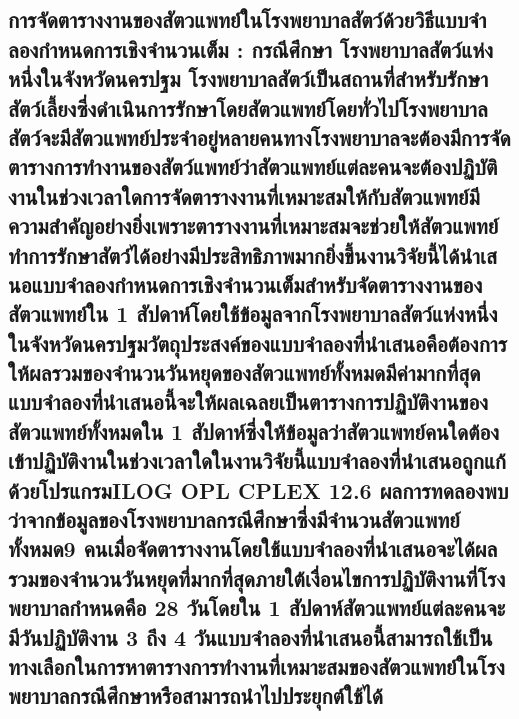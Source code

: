 \hspace{0cm}\subsection{การจัดตารางงานของสัตวแพทย์ในโรงพยาบาลสัตว์ด้วยวิธีแบบจําลองกําหนดการเชิงจํานวนเต็ม : กรณีศึกษา โรงพยาบาลสัตว์แห่งหนึ่งในจังหวัดนครปฐม โรงพยาบาลสัตว์เป็นสถานที่สําหรับรักษาสัตว์เลี้ยงซึ่งดําเนินการรักษาโดยสัตวแพทย์โดยทั่วไปโรงพยาบาลสัตว์จะมีสัตวแพทย์ประจําอยู่หลายคนทางโรงพยาบาลจะต้องมีการจัดตารางการทํางานของสัตว์แพทย์ว่าสัตวแพทย์แต่ละคนจะต้องปฏิบัติงานในช่วงเวลาใดการจัดตารางงานที่เหมาะสมให้กับสัตวแพทย์มีความสําคัญอย่างยิ่งเพราะตารางงานที่เหมาะสมจะช่วยให้สัตวแพทย์ทําการรักษาสัตว์ได้อย่างมีประสิทธิภาพมากยิ่งขึ้นงานวิจัยนี้ได้นําเสนอแบบจําลองกําหนดการเชิงจํานวนเต็มสําหรับจัดตารางงานของสัตวแพทย์ใน 1 สัปดาห์โดยใช้ข้อมูลจากโรงพยาบาลสัตว์แห่งหนึ่งในจังหวัดนครปฐมวัตถุประสงค์ของแบบจําลองที่นําเสนอคือต้องการให้ผลรวมของจํานวนวันหยุดของสัตวแพทย์ทั้งหมดมีค่ามากที่สุดแบบจําลองที่นําเสนอนี้จะให้ผลเฉลยเป็นตารางการปฏิบัติงานของสัตวแพทย์ทั้งหมดใน 1 สัปดาห์ซึ่งให้ข้อมูลว่าสัตวแพทย์คนใดต้องเข้าปฏิบัติงานในช่วงเวลาใดในงานวิจัยนี้แบบจําลองที่นําเสนอถูกแก้ด้วยโปรแกรมILOG OPL CPLEX 12.6 ผลการทดลองพบว่าจากข้อมูลของโรงพยาบาลกรณีศึกษาซึ่งมีจํานวนสัตวแพทย์ทั้งหมด9 คนเมื่อจัดตารางงานโดยใช้แบบจําลองที่นําเสนอจะได้ผลรวมของจํานวนวันหยุดที่มากที่สุดภายใต้เงื่อนไขการปฏิบัติงานที่โรงพยาบาลกําหนดคือ 28 วันโดยใน 1 สัปดาห์สัตวแพทย์แต่ละคนจะมีวันปฏิบัติงาน 3 ถึง 4 วันแบบจําลองที่นําเสนอนี้สามารถใช้เป็นทางเลือกในการหาตารางการทํางานที่เหมาะสมของสัตวแพทย์ในโรงพยาบาลกรณีศึกษาหรือสามารถนําไปประยุกต์ใช้ได้ \cite{vijai4}}

